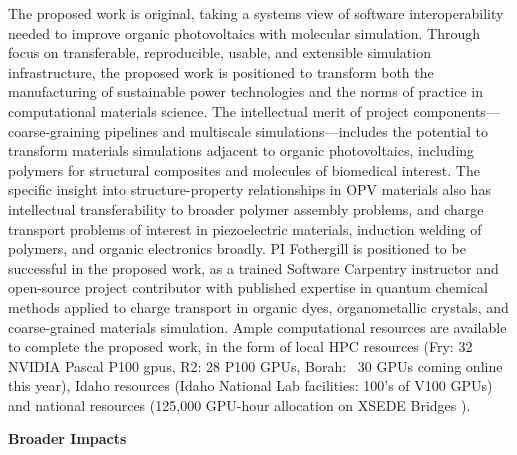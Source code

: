 The proposed work is original, taking a systems view of software interoperability needed to improve organic photovoltaics with molecular simulation.
Through focus on transferable, reproducible, usable, and extensible simulation infrastructure, the proposed work is positioned to transform both the manufacturing of sustainable power technologies and the norms of practice in computational materials science.
The intellectual merit of project components---coarse-graining pipelines and multiscale simulations---includes the potential to transform materials simulations adjacent to organic photovoltaics, including polymers for structural composites and molecules of biomedical interest.
The specific insight into structure-property relationships in OPV materials also has intellectual transferability to broader polymer assembly problems, and charge transport problems of interest in piezoelectric materials, induction welding of polymers, and organic electronics broadly.
PI Fothergill is positioned to be successful in the proposed work, as a trained Software Carpentry instructor and open-source project contributor with published expertise in quantum chemical methods applied to charge transport in organic dyes, organometallic crystals, and coarse-grained materials simulation.
Ample computational resources are available to complete the proposed work, in the form of local HPC resources (Fry: 32 NVIDIA Pascal P100 gpus, R2: 28 P100 GPUs, Borah: ~30 GPUs coming online this year), Idaho resources (Idaho National Lab facilities: 100's of V100 GPUs) and national resources (125,000 GPU-hour allocation on XSEDE Bridges ).

\begin{center}
    \textbf{Broader Impacts}
\end{center}

